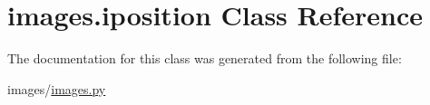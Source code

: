 \hypertarget{classimages_1_1iposition}{}\section{images.\+iposition Class Reference}
\label{classimages_1_1iposition}


The documentation for this class was generated from the following file\+:\begin{DoxyCompactItemize}
\item 
images/\hyperlink{images_8py}{images.\+py}\end{DoxyCompactItemize}

